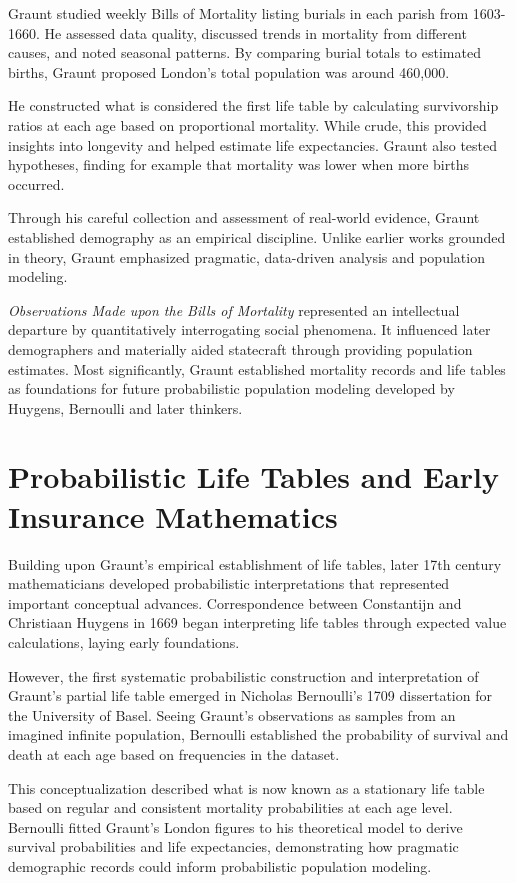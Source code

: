 Graunt studied weekly Bills of Mortality listing burials in each parish from 1603-1660. He assessed data quality, discussed trends in mortality from different causes, and noted seasonal patterns. By comparing burial totals to estimated births, Graunt proposed London's total population was around 460,000.

He constructed what is considered the first life table by calculating survivorship ratios at each age based on proportional mortality. While crude, this provided insights into longevity and helped estimate life expectancies. Graunt also tested hypotheses, finding for example that mortality was lower when more births occurred.

Through his careful collection and assessment of real-world evidence, Graunt established demography as an empirical discipline. Unlike earlier works grounded in theory, Graunt emphasized pragmatic, data-driven analysis and population modeling.

\emph{Observations Made upon the Bills of Mortality} represented an intellectual departure by quantitatively interrogating social phenomena. It influenced later demographers and materially aided statecraft through providing population estimates. Most significantly, Graunt established mortality records and life tables as foundations for future probabilistic population modeling developed by Huygens, Bernoulli and later thinkers. 

\section{Probabilistic Life Tables and Early Insurance Mathematics}

Building upon Graunt's empirical establishment of life tables, later 17th century mathematicians developed probabilistic interpretations that represented important conceptual advances. Correspondence between Constantijn and Christiaan Huygens in 1669 began interpreting life tables through expected value calculations, laying early foundations.

However, the first systematic probabilistic construction and interpretation of Graunt's partial life table emerged in Nicholas Bernoulli's 1709 dissertation for the University of Basel. Seeing Graunt's observations as samples from an imagined infinite population, Bernoulli established the probability of survival and death at each age based on frequencies in the dataset.

This conceptualization described what is now known as a stationary life table based on regular and consistent mortality probabilities at each age level. Bernoulli fitted Graunt's London figures to his theoretical model to derive survival probabilities and life expectancies, demonstrating how pragmatic demographic records could inform probabilistic population modeling.

